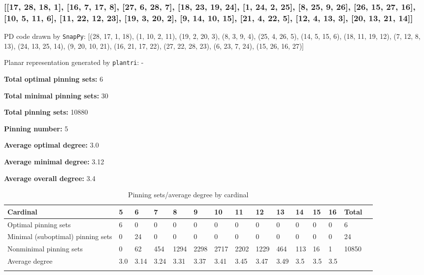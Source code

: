 \documentclass{article}%
\begin{document}
\newpage

\subsubsection{[[17, 28, 18, 1], [16, 7, 17, 8], [27, 6, 28, 7], [18, 23, 19, 24], [1, 24, 2, 25], [8, 25, 9, 26], [26, 15, 27, 16], [10, 5, 11, 6], [11, 22, 12, 23], [19, 3, 20, 2], [9, 14, 10, 15], [21, 4, 22, 5], [12, 4, 13, 3], [20, 13, 21, 14]]}

{\small\noindent PD code drawn by \texttt{SnapPy}: [(28, 17, 1, 18), (1, 10, 2, 11), (19, 2, 20, 3), (8, 3, 9, 4), (25, 4, 26, 5), (14, 5, 15, 6), (18, 11, 19, 12), (7, 12, 8, 13), (24, 13, 25, 14), (9, 20, 10, 21), (16, 21, 17, 22), (27, 22, 28, 23), (6, 23, 7, 24), (15, 26, 16, 27)]}

{\small\noindent Planar representation generated by \texttt{plantri}: -}

\begin{multicols}{2}
{\normalsize \noindent\textbf{Total optimal pinning sets:} 6

\noindent\textbf{Total minimal pinning sets:} 30

\noindent\textbf{Total pinning sets:} 10880

\noindent\textbf{Pinning number:} 5

}
\columnbreak

{\normalsize \noindent\textbf{Average optimal degree:} 3.0

\noindent\textbf{Average minimal degree:} 3.12

\noindent\textbf{Average overall degree:} 3.4

}
\end{multicols}

\begin{table}[ht]
	\caption{Pinning sets/average degree by cardinal}
	\centering
	\renewcommand{\arraystretch}{1.5}
	\begin{tabularx}{\textwidth}{lXXXXXXXXXXXXXX}
		\toprule
			Cardinal & 5 & 6 & 7 & 8 & 9 & 10 & 11 & 12 & 13 & 14 & 15 & 16 & Total\\
			\hline
			Optimal pinning sets & 6 & 0 & 0 & 0 & 0 & 0 & 0 & 0 & 0 & 0 & 0 & 0 & 6 \\
			Minimal (suboptimal) pinning sets & 0 & 24 & 0 & 0 & 0 & 0 & 0 & 0 & 0 & 0 & 0 & 0 & 24 \\
			Nonminimal pinning sets & 0 & 62 & 454 & 1294 & 2298 & 2717 & 2202 & 1229 & 464 & 113 & 16 & 1 & 10850 \\
			Average degree & 3.0 & 3.14 & 3.24 & 3.31 & 3.37 & 3.41 & 3.45 & 3.47 & 3.49 & 3.5 & 3.5 & 3.5 &  \\
		\bottomrule \\ 
	\end{tabularx}
\end{table}
\end{document}

